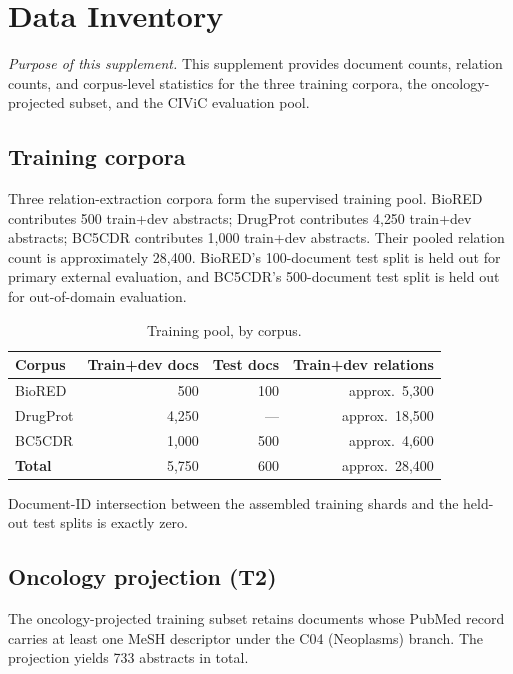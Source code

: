 \section{Data Inventory}
\label{supp:data}

\textit{Purpose of this supplement.}\;
This supplement provides document counts, relation counts, and
corpus-level statistics for the three training corpora, the
oncology-projected subset, and the CIViC evaluation pool.

\subsection{Training corpora}

Three relation-extraction corpora form the supervised training
pool. BioRED contributes 500 train+dev abstracts; DrugProt
contributes 4{,}250 train+dev abstracts; BC5CDR contributes 1{,}000
train+dev abstracts. Their pooled relation count is approximately
28{,}400. BioRED's 100-document test split is held out for primary
external evaluation, and BC5CDR's 500-document test split is held
out for out-of-domain evaluation.

\begin{table}[H]
\centering
\caption{Training pool, by corpus.}
\label{tab:s2-counts}
\small
\begin{tabular}{@{}lrrr@{}}
\toprule
\textbf{Corpus} & \textbf{Train+dev docs} & \textbf{Test docs} & \textbf{Train+dev relations} \\
\midrule
BioRED   & 500    & 100 & approx.\ 5{,}300 \\
DrugProt & 4{,}250 & --- & approx.\ 18{,}500 \\
BC5CDR   & 1{,}000 & 500 & approx.\ 4{,}600 \\
\midrule
\textbf{Total} & 5{,}750 & 600 & approx.\ 28{,}400 \\
\bottomrule
\end{tabular}
\end{table}

Document-ID intersection between the assembled training shards and
the held-out test splits is exactly zero.

\subsection{Oncology projection (T2)}

The oncology-projected training subset retains documents whose PubMed
record carries at least one MeSH descriptor under the C04 (Neoplasms)
branch. The projection yields 733 abstracts in total.

